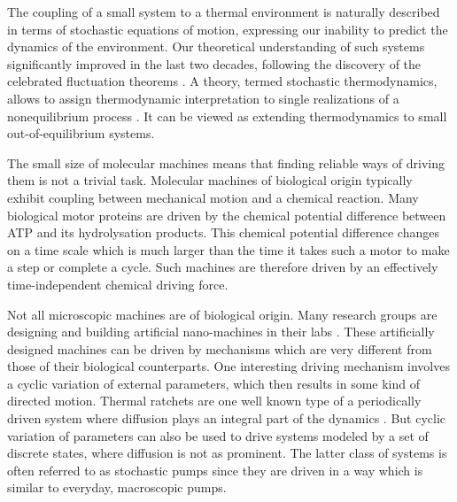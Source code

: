 \documentclass[aps,pre,showpacs,amsmath,amssymb,amsfonts,superscriptaddress,onecolumn,longbibliography]{revtex4-1}
\begin{document}
The coupling of a small system to a thermal environment is naturally described in terms of
stochastic equations of motion, expressing our inability to predict the dynamics of the environment.
Our theoretical understanding of such systems significantly improved in the last two
decades, following the discovery of the celebrated fluctuation theorems \cite{Evans1993,Evans1994,Gallavotti1995,Kurchan1998,Lebowitz1999,
Seifert2005, Rahav2013,Harbola2014,Jarzynski1997,Crooks1998}. A theory, termed stochastic
thermodynamics, allows to assign thermodynamic interpretation to single realizations of a
nonequilibrium process \cite{Sekimoto1997,Seifert2012}. It can be viewed as extending thermodynamics
to small out-of-equilibrium systems.

The small size of molecular machines means that
finding reliable ways of driving them is not a trivial task.
Molecular machines of biological origin typically exhibit coupling
between mechanical motion and a chemical reaction. Many biological motor proteins are driven by the chemical
potential difference between ATP and its hydrolysation products.
This chemical potential
difference changes on a time scale which is much larger than the time it takes
such a motor to make a step or complete a cycle. Such machines are therefore
driven by an effectively time-independent chemical driving force.

Not all microscopic machines are of biological origin. Many research groups are designing and building
artificial nano-machines in their labs \citep{kay_synthetic_2007,kottas_artificial_2005,michl_molecular_2009,feringa_art_2007}.
These artificially designed machines can be driven by mechanisms which are very different from those of their biological counterparts. One interesting
driving mechanism involves a cyclic variation of external parameters, which then results in some kind of directed motion. Thermal ratchets are one well known
type of a periodically driven system where diffusion plays an integral part of the dynamics \cite{Reimann2002}.
But cyclic variation of parameters can also be used to drive systems modeled
by a set of discrete states, where diffusion is not as prominent. The latter class of systems is often
referred to as stochastic pumps \citep{sinitsyn_universal_2007,sinitsyn_stochastic_2009,chernyak_quantization_2012,parrondo_reversible_1998,astumian_adiabatic_2007,sokolov_perturbation_1999,astumian_adiabatic_2003,rahav_extracting_2011,sinitsyn_stochastic_2009,astumian_stochastic_2011} since they are driven in a way which is similar to everyday, macroscopic pumps.
\end{document}
